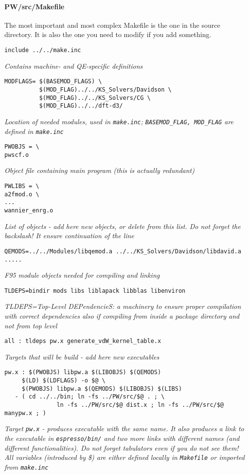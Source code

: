 \documentclass[12pt,a4paper]{article}
\def\qe{QE}
\begin{document}
\paragraph{PW/src/Makefile}
The most important and most complex Makefile is the one in the
source directory. It is also the one you need to modify if you
add something.
\begin{verbatim}
include ../../make.inc
\end{verbatim}
{\em Contains machine- and \qe-specific definitions}
\begin{verbatim}
MODFLAGS= $(BASEMOD_FLAGS) \
          $(MOD_FLAG)../../KS_Solvers/Davidson \
          $(MOD_FLAG)../../KS_Solvers/CG \
          $(MOD_FLAG)../../dft-d3/
\end{verbatim}
    {\em Location of needed modules, used in  \texttt{make.inc};
      \texttt{BASEMOD\_FLAG, MOD\_FLAG} are defined in \texttt{make.inc}}
\begin{verbatim}
PWOBJS = \
pwscf.o
\end{verbatim}
{\em Object file containing main program (this is actually redundant)}
\begin{verbatim}
PWLIBS = \
a2fmod.o \
...
wannier_enrg.o
\end{verbatim}
{\em List of objects - add here new objects, or delete from this list. Do not
forget the backslash! It ensure continuation of the line}
\begin{verbatim}
QEMODS=../../Modules/libqemod.a ../../KS_Solvers/Davidson/libdavid.a .....
\end{verbatim}
{\em F95 module objects needed for compiling and linking}
\begin{verbatim}
TLDEPS=bindir mods libs liblapack libblas libenviron
\end{verbatim}
{\em TLDEPS=Top-Level DEPendencieS: a machinery to ensure proper
compilation with correct dependencies also if compiling from inside
a package directory and not from top level}
\begin{verbatim}
all : tldeps pw.x generate_vdW_kernel_table.x
\end{verbatim}
{\em Targets that will be build - add here new executables}
\begin{verbatim}
pw.x : $(PWOBJS) libpw.a $(LIBOBJS) $(QEMODS)
     $(LD) $(LDFLAGS) -o $@ \
     $(PWOBJS) libpw.a $(QEMODS) $(LIBOBJS) $(LIBS)
   - ( cd ../../bin; ln -fs ../PW/src/$@ . ; \
               ln -fs ../PW/src/$@ dist.x ; ln -fs ../PW/src/$@ manypw.x ; )
\end{verbatim}
{\em Target {\tt pw.x} - produces executable with the same name.
  It also produces a link to the executable in {\tt espresso/bin/}
  and two more links with different names (and different functionalities).
Do not forget tabulators even if you do not see them!
All variables (introduced by \$) are either defined locally
in {\tt Makefile} or imported from {\tt make.inc}}
\end{document}
